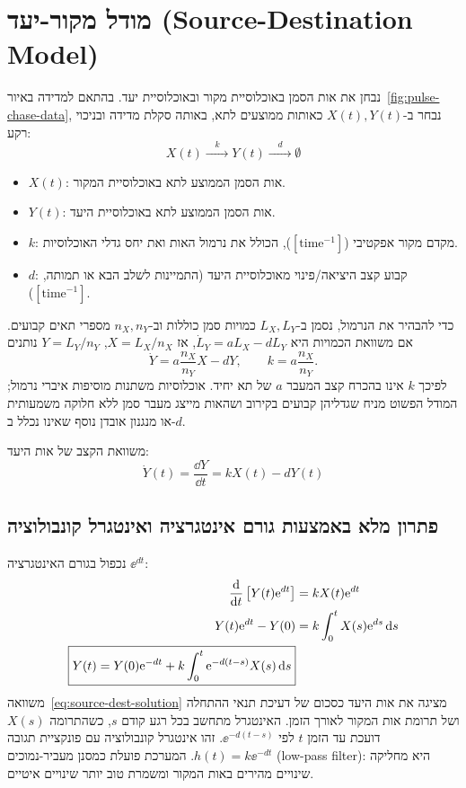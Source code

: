 \section{מודל מקור-יעד (\texorpdfstring{\textenglish{Source-Destination Model}}{Source-Destination Model})}\label{sec:source-dest}
נבחן את אות הסמן באוכלוסיית מקור ובאוכלוסיית יעד. בהתאם למדידה באיור~\ref{fig:pulse-chase-data}, נבחר ב-$X(t),Y(t)$ כאותות ממוצעים לתא, באותה סקלת מדידה ובניכוי רקע:
\begin{equation}\label{eq:source-dest-scheme}
X(t) \xrightarrow{\quad k \quad} Y(t) \xrightarrow{\quad d \quad} \emptyset
\end{equation}
\begin{itemize}
\item $X(t)$: אות הסמן הממוצע לתא באוכלוסיית המקור.
\item $Y(t)$: אות הסמן הממוצע לתא באוכלוסיית היעד.
\item $k$: מקדם מקור אפקטיבי ($[\text{time}^{-1}]$), הכולל את נרמול האות ואת יחס גדלי האוכלוסיות.
\item $d$: קבוע קצב היציאה/פינוי מאוכלוסיית היעד (התמיינות לשלב הבא או תמותה, $[\text{time}^{-1}]$).
\end{itemize}

כדי להבהיר את הנרמול, נסמן ב-$L_X,L_Y$ כמויות סמן כוללות וב-$n_X,n_Y$ מספרי תאים קבועים. אם משוואת הכמויות היא $\dot L_Y=aL_X-dL_Y$, אז $X=L_X/n_X$, $Y=L_Y/n_Y$ נותנים
\begin{equation}\label{eq:tracer-normalization}
\dot Y=a\frac{n_X}{n_Y}X-dY,\qquad k=a\frac{n_X}{n_Y}.
\end{equation}
לפיכך $k$ אינו בהכרח קצב המעבר $a$ של תא יחיד. אוכלוסיות משתנות מוסיפות איברי נרמול; המודל הפשוט מניח שגדליהן קבועים בקירוב ושהאות מייצג מעבר סמן ללא חלוקה משמעותית או מנגנון אובדן נוסף שאינו נכלל ב-$d$.

משוואת הקצב של אות היעד:
\begin{equation}\label{eq:source-dest-ode}
\dot{Y}(t) = \frac{\dd Y}{\dd t} = k X(t) - d Y(t)
\end{equation}

\subsection{פתרון מלא באמצעות גורם אינטגרציה ואינטגרל קונבולוציה}
נכפול בגורם האינטגרציה $\ee^{dt}$:
\begin{align}
\frac{\mathrm{d}}{\mathrm{d} t}\left[ Y(t)\mathrm{e}^{dt} \right] &= k X(t) \mathrm{e}^{dt} \notag\\
Y(t)\mathrm{e}^{dt} - Y(0) &= k \int_0^t X(s)\mathrm{e}^{ds}\,\mathrm{d} s \notag\\
\boxed{Y(t) = Y(0)\mathrm{e}^{-dt} + k \int_0^t \mathrm{e}^{-d(t-s)} X(s)\,\mathrm{d} s} \label{eq:source-dest-solution}
\end{align}
משוואה~\eqref{eq:source-dest-solution} מציגה את אות היעד כסכום של דעיכת תנאי ההתחלה ושל תרומת אות המקור לאורך הזמן. האינטגרל מתחשב בכל רגע קודם $s$, כשהתרומה $X(s)$ דועכת עד הזמן $t$ לפי $\ee^{-d(t-s)}$. זהו אינטגרל קונבולוציה עם פונקציית תגובה $h(t)=k\ee^{-dt}$. המערכת פועלת כמסנן מעביר-נמוכים (\textenglish{low-pass filter}): היא מחליקה שינויים מהירים באות המקור ומשמרת טוב יותר שינויים איטיים.

